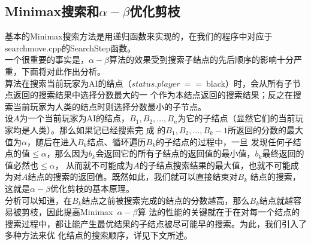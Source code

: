 \documentclass{acm_proc_article-sp}
\begin{document}
\subsection{\textbf{Minimax搜索和$\alpha-\beta$优化剪枝}}
基本的Minimax搜索方法是用递归函数来实现的，在我们的程序中对应于searchmove.cpp的SearchStep函数。\\
一个很重要的事实是，$\alpha-\beta$算法的效果受到搜索子结点的先后顺序的影响十分严重，下面将对此作出分析。\\
算法在搜索当前玩家为AI的结点（$status.player\ ==\ $black）时，会从所有子节点返回的搜索结果中选择分数最大的一
个作为本结点返回的搜索结果；反之在搜索当前玩家为人类的结点时则选择分数最小的子节点。\\
设$A$为一个当前玩家为AI的结点，$B_1, B_2, \dots , B_n$为它的子结点（显然它们的当前玩家均是人类）。那么如果记已经搜索完
成 的$B_1, B_2, \dots , B_k-1$所返回的分数的最大值为$\alpha$，随后在进入$B_k$结点、循环遍历$B_k$的子结点的过程中，一旦
发现任何子结点的值$\leq \alpha$，那么因为$b_k$会返回它的所有子结点的返回值的最小值，$b_k$最终返回的值必然也$\leq \alpha$，
从而就不可能成为$A$的子结点搜索结果的最大值，也就不可能成为对$A$结点的搜索的返回值。既然如此，我们就可以直接结束对$B_k$
结点的搜索，这就是$\alpha-\beta$优化剪枝的基本原理。\\
分析可以知道，在$B_k$结点之前被搜索完成的结点的分数越高，那么$B_k$结点就越容易被剪枝，因此提高Minimax\ $\alpha-\beta$算
法的性能的关键就在于在对每一个结点的搜索过程中，都让能产生最优结果的子结点被尽可能早的搜索。为此，我们引入了多种方法来优
化结点的搜索顺序，详见下文所述。
\end{document}
